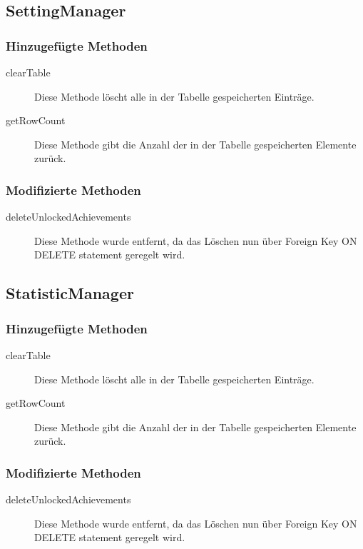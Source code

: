 \subsection{SettingManager}

\subsubsection{Hinzugefügte Methoden}
\begin{description}
\item[clearTable]
Diese Methode löscht alle in der Tabelle gespeicherten Einträge.
\item[getRowCount]
Diese Methode gibt die Anzahl der in der Tabelle gespeicherten Elemente zurück.
\end{description}

\subsubsection{Modifizierte Methoden}
\begin{description}
\item[deleteUnlockedAchievements]
Diese Methode wurde entfernt, da das Löschen nun über Foreign Key ON DELETE statement geregelt wird.
\end{description}


\subsection{StatisticManager}

\subsubsection{Hinzugefügte Methoden}
\begin{description}
\item[clearTable]
Diese Methode löscht alle in der Tabelle gespeicherten Einträge.
\item[getRowCount]
Diese Methode gibt die Anzahl der in der Tabelle gespeicherten Elemente zurück.
\end{description}

\subsubsection{Modifizierte Methoden}
\begin{description}
\item[deleteUnlockedAchievements]
Diese Methode wurde entfernt, da das Löschen nun über Foreign Key ON DELETE statement geregelt wird.
\end{description}

